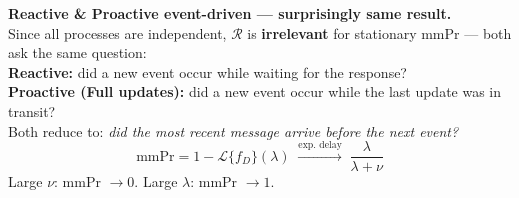 \documentclass[10pt,a4paper]{article}
\begin{document}
\begin{minipage}[t]{0.47\textwidth}
\vspace{0pt}
\begin{keybox}
\textbf{Reactive \& Proactive event-driven --- surprisingly same result.}\\[2pt]
Since all processes are independent, $\mathcal{R}$ is \textbf{irrelevant} for stationary mmPr --- both ask the same question:\\[2pt]
\textbf{Reactive:} did a new event occur while waiting for the response?\\[1pt]
\textbf{Proactive (Full updates):} did a new event occur while the last update was in transit?\\[2pt]
Both reduce to: \emph{did the most recent message arrive before the next event?}
\[ \mathrm{mmPr} = 1 - \mathcal{L}\{f_D\}(\lambda) \;\xrightarrow{\text{exp.\ delay}}\; \frac{\lambda}{\lambda+\nu} \]
Large $\nu$: mmPr $\to 0$. \quad Large $\lambda$: mmPr $\to 1$.
\end{keybox}
\end{minipage}\hfill
\end{document}
